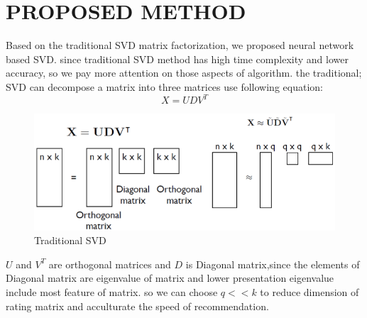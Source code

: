 \documentclass{acmtog} %
\begin{document}
\section{PROPOSED METHOD}
Based on the traditional SVD matrix factorization, we proposed neural network based SVD. since traditional SVD method has high time complexity and lower accuracy, so we pay more attention on those aspects of algorithm.
the traditional; SVD can decompose a matrix into three matrices use following equation:
\begin{equation}
X=UDV^T
\end{equation}
\begin{figure}[htbp]
	\centering
	\includegraphics[width=0.7 \linewidth]{pa1}
	\caption{Traditional SVD}
	\label{fig:pa1}
\end{figure}
$U$ and $V^T$ are orthogonal matrices and $D$ is Diagonal matrix,since the elements of Diagonal matrix are eigenvalue of matrix and lower presentation eigenvalue include most feature of matrix. so we can choose $q<<k$ to reduce dimension of rating matrix and acculturate the speed of  recommendation.
\\
\end{document}
